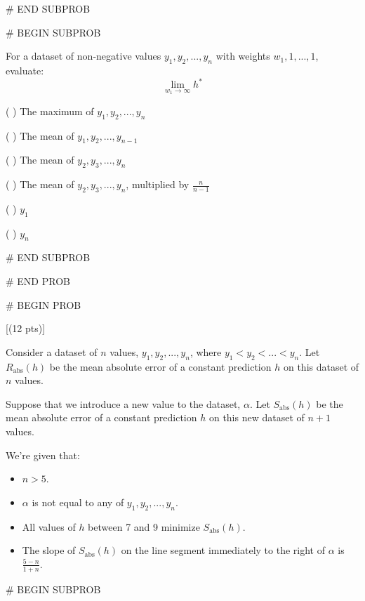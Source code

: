 \documentclass[twoside,12pt]{article}
\begin{document}
{{\begin{responsebox}{5in}

\end{responsebox}
    


# END SUBPROB

# BEGIN SUBPROB

 For a dataset of non-negative values $y_1, y_2, ..., y_n$ with weights $w_1, 1, ..., 1$, evaluate: $$\displaystyle \lim_{w_1 \rightarrow \infty} h^*$$

( ) The maximum of $y_1, y_2, ..., y_n$

( ) The mean of $y_1, y_2, ..., y_{n-1}$

( ) The mean of $y_2, y_3, ..., y_n$

( ) The mean of $y_2, y_3, ..., y_n$, multiplied by $\frac{n}{n-1}$

( ) $y_1$

( ) $y_n$

    


# END SUBPROB
    

    


# END PROB

\newpage

# BEGIN PROB

[(12 pts)]

Consider a dataset of $n$ values, $y_1, y_2, ..., y_n$, where $y_1 < y_2 < ... < y_n$. Let $R_\text{abs}(h)$ be the mean absolute error of a constant prediction $h$ on this dataset of $n$ values.

Suppose that we introduce a new value to the dataset, $\alpha$. Let $S_\text{abs}(h)$ be the mean absolute error of a constant prediction $h$ on this new dataset of $n + 1$ values.

We're given that:

\begin{itemize}
    \item $n > 5$.
    \item $\alpha$ is not equal to any of $y_1, y_2, ..., y_n$. 
    \item All values of $h$ between 7 and 9 minimize $S_\text{abs}(h)$.
    \item The slope of $S_\text{abs}(h)$ on the line segment immediately to the right of $\alpha$ is $\frac{5-n}{1 + n}$.
\end{itemize}



# BEGIN SUBPROB

}}
\end{document}
